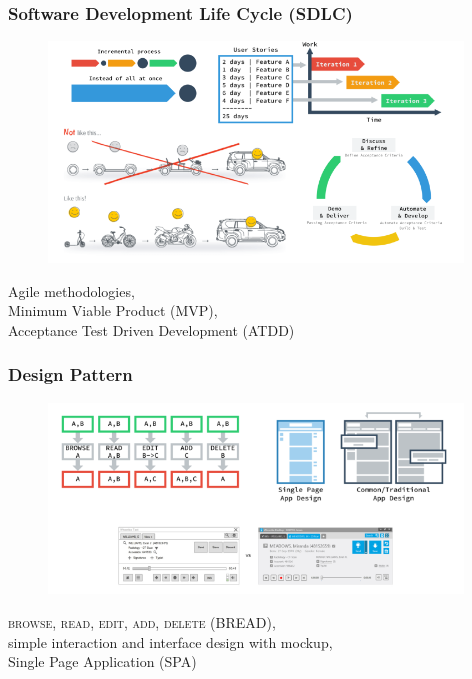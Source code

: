 \documentclass[10pt, compress]{beamer}
\begin{document}

\begin{frame}[fragile]
  \frametitle{Software Development Life Cycle (SDLC)}
  \centering

  \begin{figure}[ht]
    \vspace{-1cm}
    \includegraphics[width=11cm]{include/literature-sdlc.png}
  \end{figure}

  \alert{Agile} methodologies,\\
  Minimum Viable Product (\alert{MVP}),\\
  Acceptance Test Driven Development (\alert{ATDD})

\end{frame}


\begin{frame}[fragile]
  \frametitle{Design Pattern}
  \centering

  \begin{figure}[ht]
    \vspace{-1cm}
    \includegraphics[width=11cm]{include/literature-design-pattern.png}
  \end{figure}

  \textsc{browse, read, edit, add, delete} (\alert{BREAD}),\\
  simple interaction and interface design with mockup,\\
  Single Page Application (\alert{SPA})

\end{frame}
\end{document}
